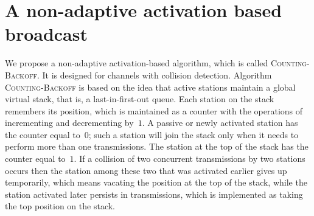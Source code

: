 \documentclass[11pt]{article}
\begin{document}
\section{A non-adaptive activation based broadcast}

\label{sec:non-adaptive-activation-based}





We propose a non-adaptive activation-based algorithm, which is called \textsc{Counting-Backoff}.
It is designed for channels with collision detection.
Algorithm \textsc{Counting-Backoff} is based on the idea that active stations maintain a global virtual stack, that is, a last-in-first-out queue.
Each station on the stack remembers its position, which is maintained as a counter with the operations of incrementing and decrementing by~$1$.
A passive or newly activated station has the counter equal to~$0$; such a station will join the stack only when it needs to perform more than one transmissions.
The station at the top of the stack has the counter equal to~$1$.
If a collision of two concurrent transmissions by two stations occurs then the station among these two that was activated earlier gives up temporarily, which means vacating the position at the top of the stack, while the station activated later persists in transmissions, which is implemented as  taking the top position on the stack.
\end{document}
